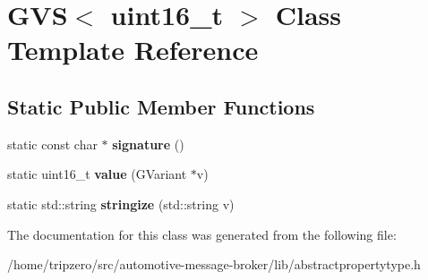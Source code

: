 \hypertarget{classGVS_3_01uint16__t_01_4}{\section{G\-V\-S$<$ uint16\-\_\-t $>$ Class Template Reference}
\label{classGVS_3_01uint16__t_01_4}
}
\subsection*{Static Public Member Functions}
\begin{DoxyCompactItemize}
\item 
\hypertarget{classGVS_3_01uint16__t_01_4_a7db0c4a8cd2454cd49ede1fb7a026e49}{static const char $\ast$ {\bfseries signature} ()}\label{classGVS_3_01uint16__t_01_4_a7db0c4a8cd2454cd49ede1fb7a026e49}

\item 
\hypertarget{classGVS_3_01uint16__t_01_4_a629f9b3cba434e8c808d545ca8a8e557}{static uint16\-\_\-t {\bfseries value} (G\-Variant $\ast$v)}\label{classGVS_3_01uint16__t_01_4_a629f9b3cba434e8c808d545ca8a8e557}

\item 
\hypertarget{classGVS_3_01uint16__t_01_4_a4d7e2288bb0be81487945a42e7aa8224}{static std\-::string {\bfseries stringize} (std\-::string v)}\label{classGVS_3_01uint16__t_01_4_a4d7e2288bb0be81487945a42e7aa8224}

\end{DoxyCompactItemize}


The documentation for this class was generated from the following file\-:\begin{DoxyCompactItemize}
\item 
/home/tripzero/src/automotive-\/message-\/broker/lib/abstractpropertytype.\-h\end{DoxyCompactItemize}
